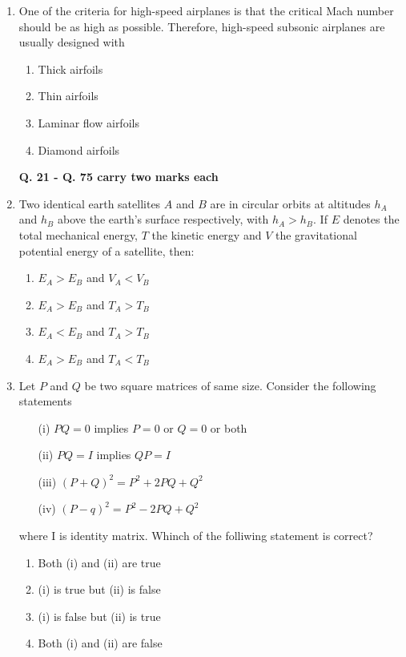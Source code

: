\documentclass{article}
\begin{document}
\begin{enumerate}
    \item One of the criteria for high-speed airplanes is that the critical Mach number should be as high as possible. Therefore, high-speed subsonic airplanes are usually designed with 
    \begin{enumerate}
        \item Thick airfoils
        \item Thin airfoils
        \item Laminar flow airfoils
        \item Diamond airfoils
    \end{enumerate}
        

\newpage
\begin{center}
    \textbf{Q. 21 - Q. 75 carry two marks each}
\end{center}


    \item Two identical earth satellites $A$ and $B$ are in circular orbits at altitudes $h_A$ and $h_B$ above the earth's surface respectively, with $h_A > h_B$. If $E$ denotes the total mechanical energy, $T$ the kinetic energy and $V$ the gravitational potential energy of a satellite, then: 
    \begin{enumerate}
        \item $E_A > E_B$ and $V_A < V_B$
        \item $E_A > E_B$ and $T_A > T_B$
        \item $E_A < E_B$ and $T_A > T_B$
        \item $E_A > E_B$ and $T_A < T_B$
    \end{enumerate}
        

    \item Let $P$ and $Q$ be two square matrices of same size. Consider the following statements
    \begin{enumerate}
        \item[(i)] $PQ = 0$ implies $P = 0$ or $Q = 0$ or both
        \item[(ii)] $PQ = I$ implies $QP = I$
        \item[(iii)] $(P + Q)^2 = P^2 + 2PQ + Q^2$
        \item[(iv)] $(P - q)^2 = P^2 - 2PQ + Q^2$
    \end{enumerate}
    where I is identity matrix. Whinch of the folliwing statement is correct? 
    \begin{enumerate}
        \item Both (i) and (ii) are true
        \item (i) is true but (ii) is false
        \item (i) is false but (ii) is true
        \item Both (i) and (ii) are false
    \end{enumerate}
        


\end{enumerate}
\end{document}
